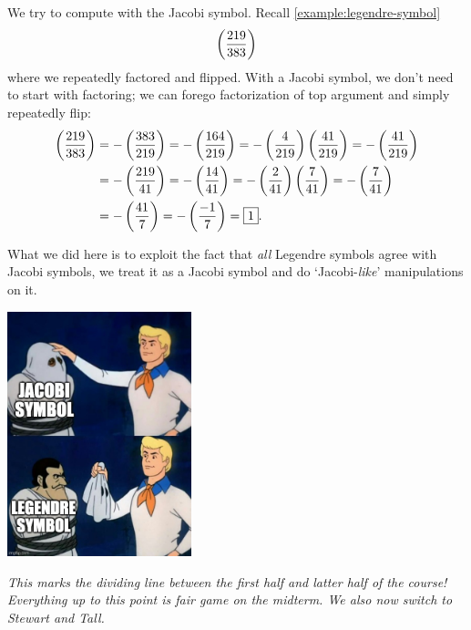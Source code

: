 \begin{example}
    We try to compute with the Jacobi symbol. Recall \cref{example:legendre-symbol}
    \[\left(\dfrac{219}{383}\right)\]
    where we repeatedly factored and flipped. With a Jacobi symbol, we don't need to start with factoring; we can forego factorization of top argument and simply repeatedly flip:
    \begin{align*}
        \left(\dfrac{219}{383}\right) & = - \left(\dfrac{383}{219}\right) = -\left(\dfrac{164}{219}\right) = - \left(\dfrac{4}{219}\right)\left(\dfrac{41}{219}\right) = - \left(\dfrac{41}{219}\right) \\
                        & = - \left(\dfrac{219}{41}\right) = - \left(\dfrac{14}{41}\right) = - \left(\dfrac{2}{41}\right)\left(\dfrac{7}{41}\right) = -\left(\dfrac{7}{41}\right)         \\
                        & = -\left(\dfrac{41}{7}\right) = -\left(\dfrac{-1}{7}\right) = \boxed{1}.
    \end{align*}
\end{example}
What we did here is to exploit the fact that \emph{all} Legendre symbols agree with Jacobi symbols, we treat it as a Jacobi symbol and do `Jacobi-\emph{like}' manipulations on it.
\begin{center}
    \includegraphics[width=0.4\textwidth]{images/jacobi_legendre_reveal.jpeg}
\end{center}

\emph{This marks the dividing line between the first half and latter half of the course! Everything up to this point is fair game on the midterm. We also now switch to Stewart and Tall.}

